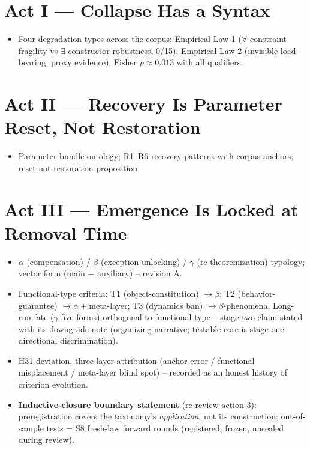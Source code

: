\documentclass[11pt]{article}
\begin{document}
\section{Act I --- Collapse Has a Syntax}\label{sec:act1}
\begin{itemize}
  \item Four degradation types across the corpus; Empirical Law 1
        ($\forall$-constraint fragility vs $\exists$-constructor
        robustness, 0/15); Empirical Law 2 (invisible load-bearing,
        proxy evidence); Fisher $p\approx0.013$ with all qualifiers.
\end{itemize}


\section{Act II --- Recovery Is Parameter Reset, Not Restoration}\label{sec:act2}
\begin{itemize}
  \item Parameter-bundle ontology; R1--R6 recovery patterns with
        corpus anchors; reset-not-restoration proposition.
\end{itemize}


\section{Act III --- Emergence Is Locked at Removal Time}\label{sec:act3}
\begin{itemize}
  \item $\alpha$ (compensation) / $\beta$ (exception-unlocking) /
        $\gamma$ (re-theoremization) typology; vector form (main +
        auxiliary) -- revision A.
  \item Functional-type criteria: T1 (object-constitution) $\to\beta$;
        T2 (behavior-guarantee) $\to\alpha+$meta-layer; T3 (dynamics
        ban) $\to\beta$-phenomena. Long-run fate ($\gamma$ five forms)
        orthogonal to functional type -- stage-two claim stated with
        its downgrade note (organizing narrative; testable core is
        stage-one directional discrimination).
  \item H31 deviation, three-layer attribution (anchor error /
        functional misplacement / meta-layer blind spot) -- recorded
        as an honest history of criterion evolution.
  \item \textbf{Inductive-closure boundary statement} (re-review
        action 3): preregistration covers the taxonomy's
        \emph{application}, not its construction; out-of-sample tests
        = S8 fresh-law forward rounds (registered, frozen, unsealed
        during review).
\end{itemize}

\end{document}
